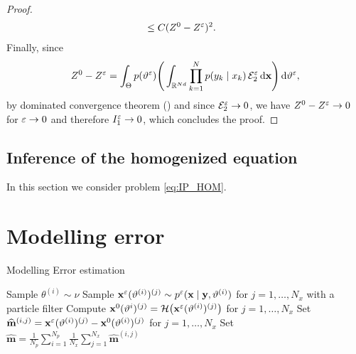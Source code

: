 \documentclass[10pt]{article}
\begin{document}
\begin{proof}
\begin{equation}
\begin{aligned}
		&\leq C(Z^0 - Z^\varepsilon)^2.
	\end{aligned}
	\end{equation}
	Finally, since
	\begin{equation}
		Z^0 - Z^\varepsilon = \int_{\Theta} p(\vartheta^\varepsilon) \Bigg(\int_{\mathbb{R}^{Nd}} \prod_{k=1}^N p(y_k \mid x_k) \, \mathcal E_2^\varepsilon \,\mathrm{d} \mathbf x \Bigg) \,\mathrm{d} \vartheta^\varepsilon,
	\end{equation}
	by dominated convergence theorem () and since $\mathcal E_2^\varepsilon \to 0$, we have $Z^0 - Z^\varepsilon \to 0$ for $\varepsilon \to 0$ and therefore $I_1^\varepsilon \to 0$, which concludes the proof.
\end{proof}

\subsection{Inference of the homogenized equation}

In this section we consider problem \eqref{eq:IP_HOM}.

\section{Modelling error}

\begin{algorithm}[t]
	\caption{Modelling Error estimation}
	\label{alg:ModErr}
	 {
		Sample $\theta^{(i)} \sim \nu$\;
		Sample $\mathbf x^{\varepsilon}(\vartheta^{(i)})^{(j)} \sim p^\varepsilon(\mathbf x \mid \mathbf y, \vartheta^{(i)})$ for $j = 1, \ldots, N_x$ with a particle filter\;
		Compute $\mathbf x^{0}(\vartheta^{i})^{(j)} = \mathcal H\big(\mathbf x^{\varepsilon}(\vartheta^{(i)})^{(j)}\big)$ for $j = 1, \ldots, N_x$\;
		Set $\widehat {\mathbf m}^{(i,j)} = \mathbf x^{\varepsilon}(\vartheta^{(i)})^{(j)} - \mathbf x^{0}(\vartheta^{(i)})^{(j)} $ for $j = 1, \ldots, N_x$\;
	}
	Set $\widehat{\mathbf m} = \frac{1}{N_p} \sum_{i=1}^{N_p} \frac{1}{N_x} \sum_{j=1}^{N_x} \widehat{\mathbf m}^{(i,j)}$ \;
\end{algorithm}
\end{document}

